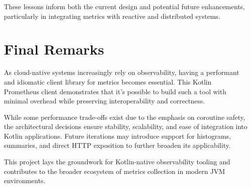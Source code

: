 These lessons inform both the current design and potential future enhancements, particularly in integrating metrics with reactive and distributed systems.

\section{Final Remarks}

As cloud-native systems increasingly rely on observability, having a performant and idiomatic client library for metrics becomes essential. This Kotlin Prometheus client demonstrates that it's possible to build such a tool with minimal overhead while preserving interoperability and correctness.

While some performance trade-offs exist due to the emphasis on coroutine safety, the architectural decisions ensure stability, scalability, and ease of integration into Kotlin applications. Future iterations may introduce support for histograms, summaries, and direct HTTP exposition to further broaden its applicability.

This project lays the groundwork for Kotlin-native observability tooling and contributes to the broader ecosystem of metrics collection in modern JVM environments.
